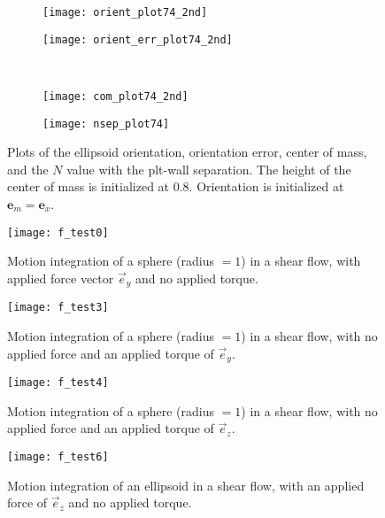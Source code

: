 \documentclass{article}
\newcommand{\vect}[1]{\boldsymbol{\mathbf{#1}}}
\begin{document}
\begin{figure}
  \centering
  \begin{subfigure}{0.49\textwidth}
    \texttt{[image: orient\_plot74\_2nd]}
  \end{subfigure}
  \hfill
  \begin{subfigure}{0.49\textwidth}
    \texttt{[image: orient\_err\_plot74\_2nd]}
  \end{subfigure}
  \\
  \begin{subfigure}{0.49\textwidth}
    \texttt{[image: com\_plot74\_2nd]}
  \end{subfigure}
  \hfill
  \begin{subfigure}{0.49\textwidth}
    \texttt{[image: nsep\_plot74]}
  \end{subfigure}  
  \caption{Plots of the ellipsoid orientation, orientation error,
    center of mass, and the $N$ value with the plt-wall
    separation. The height of the center of mass is initialized at
    $0.8$. Orientation is initialized at $\vect{e}_m =
    \vect{e}_x$.}
  \label{fig:plt74}
\end{figure}

\begin{figure}
  \centering
  \texttt{[image: f\_test0]}
  \caption{Motion integration of a sphere (radius $=1$) in a shear
    flow, with applied force vector $\vec{e}_y$ and no applied torque.}
  \label{fig:f0_plot}
\end{figure}

\begin{figure}
  \centering
  \texttt{[image: f\_test3]}
  \caption{Motion integration of a sphere (radius $=1$) in a shear
    flow, with no applied force and an applied torque of $\vec{e}_y$.}
  \label{fig:f3_plot}
\end{figure}

\begin{figure}
  \centering
  \texttt{[image: f\_test4]}
  \caption{Motion integration of a sphere (radius $=1$) in a shear
    flow, with no applied force and an applied torque of $\vec{e}_z$.}
  \label{fig:f4_plot}
\end{figure}

\begin{figure}
  \centering
  \texttt{[image: f\_test6]}
  \caption{Motion integration of an ellipsoid in a shear flow, with an
    applied force of $\vec{e}_z$ and no applied torque.}
  \label{fig:f6_plot}
\end{figure}
\end{document}
